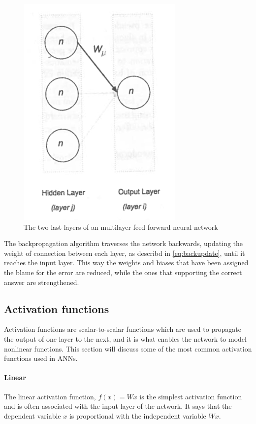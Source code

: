 \begin{figure}[!h]
	\centering
	\includegraphics[scale=1]{fig/backpropagation_two_layers.png}
	\caption{The two last layers of an multilayer feed-forward neural network \cite{Patterson2017}}
	\label{fig:backpropagationtwolayers}
\end{figure}

The backpropagation algorithm traverses the network backwards, updating the weight of connection between each layer, as describd in \autoref{eq:backupdate}, until it reaches the input layer. This way the weights and biases that have been assigned the blame for the error are reduced, while the ones that supporting the correct answer are strengthened. 

\subsection{Activation functions}
Activation functions are scalar-to-scalar functions which are used to propagate the output of one layer to the next, and it is what enables the network to model nonlinear functions. This section will discuss some of the most common activation functions used in ANNs.

\paragraph{Linear}
The linear activation function, $f(x) = Wx$ is the simplest activation function and is often associated with the input layer of the network. It says that the dependent variable $x$ is proportional with the independent variable $Wx$.

